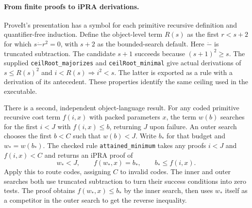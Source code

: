 \documentclass[10pt,letterpaper]{article}
\begin{document}
\paragraph{From finite proofs to iPRA derivations.}
ProveIt's presentation has a symbol for each primitive recursive
definition and quantifier-free induction. Define the object-level term
$R(s)$ as the first $r<s+2$ for which $s\mathbin{\dot-}r^2=0$, with
$s+2$ as the bounded-search default. Here $\dot-$ is truncated
subtraction. The candidate $s+1$ succeeds because $(s+1)^2\ge s$.
The supplied \texttt{ceilRoot\_majorizes} and
\texttt{ceilRoot\_minimal} give actual derivations of
$ s\le R(s)^2$ and $i<R(s)\Rightarrow i^2<s$. The latter is exported
as a rule with a derivation of its antecedent. These properties identify
the same ceiling used in the executable.

There is a second, independent object-language result. For any coded
primitive recursive cost term $f(i,x)$ with packed parameters $x$, the
term $w(b)$ searches for the first $i<J$ with $f(i,x)\le b$, returning
$J$ upon failure. An outer search chooses the first $b<C$ such that
$w(b)<J$. Write $b_*$ for that budget and $w_*=w(b_*)$.
The checked rule \texttt{attained\_minimum} takes any proofs
$i<J$ and $f(i,x)<C$ and returns an iPRA proof of
\[
 w_*<J,\qquad f(w_*,x)=b_*,\qquad b_*\le f(i,x).
\]
Apply this to route codes, assigning $C$ to invalid codes.
The inner and outer searches both use truncated subtraction to turn
their success conditions into zero tests. The proof obtains
$f(w_*,x)\le b_*$ by the inner search, then uses $w_*$ itself as a
competitor in the outer search to get the reverse inequality.
\end{document}
